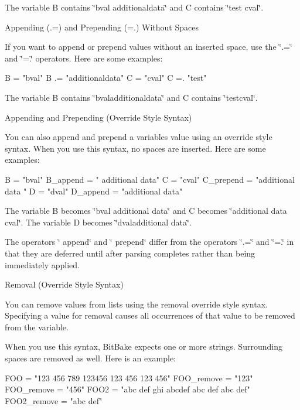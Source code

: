 \begin{DoxyItemize}
\begin{DoxyItemize}
\item The variable B contains \char`\"{}bval additionaldata\char`\"{} and C contains \char`\"{}test cval\char`\"{}.
\end{DoxyItemize}
\item Appending (.=) and Prepending (=.) Without Spaces
\begin{DoxyItemize}
\item If you want to append or prepend values without an inserted space, use the \char`\"{}.=\char`\"{} and \char`\"{}=.\char`\"{} operators. Here are some examples\+: 
\begin{DoxyCode}
B = "bval"
B .= "additionaldata"
C = "cval"
C =. "test"
\end{DoxyCode}

\item The variable B contains \char`\"{}bvaladditionaldata\char`\"{} and C contains \char`\"{}testcval\char`\"{}.
\end{DoxyItemize}
\item Appending and Prepending (Override Style Syntax)
\begin{DoxyItemize}
\item You can also append and prepend a variable\textquotesingle{}s value using an override style syntax. When you use this syntax, no spaces are inserted. Here are some examples\+: 
\begin{DoxyCode}
B = "bval"
B\_append = " additional data"
C = "cval"
C\_prepend = "additional data "
D = "dval"
D\_append = "additional data"
\end{DoxyCode}

\item The variable B becomes \char`\"{}bval additional data\char`\"{} and C becomes \char`\"{}additional data cval\char`\"{}. The variable D becomes \char`\"{}dvaladditional data\char`\"{}.
\item The operators \char`\"{} append\char`\"{} and \char`\"{} prepend\char`\"{} differ from the operators \char`\"{}.=\char`\"{} and \char`\"{}=.\char`\"{} in that they are deferred until after parsing completes rather than being immediately applied.
\end{DoxyItemize}
\item Removal (Override Style Syntax)
\begin{DoxyItemize}
\item You can remove values from lists using the removal override style syntax. Specifying a value for removal causes all occurrences of that value to be removed from the variable.
\item When you use this syntax, Bit\+Bake expects one or more strings. Surrounding spaces are removed as well. Here is an example\+: 
\begin{DoxyCode}
FOO = "123 456 789 123456 123 456 123 456"
FOO\_remove = "123"
FOO\_remove = "456"
FOO2 = "abc def ghi abcdef abc def abc def"
FOO2\_remove = "abc def"
\end{DoxyCode}


\end{DoxyItemize}
\end{DoxyItemize}
